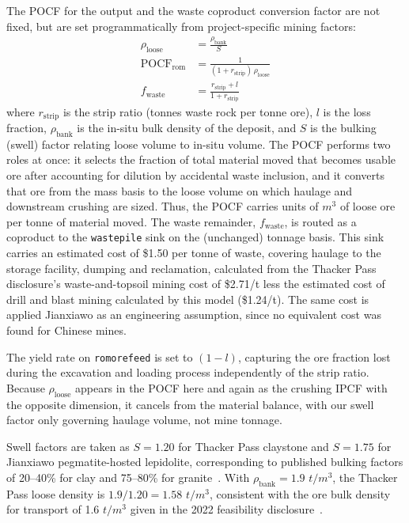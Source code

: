 \documentclass{article}
\renewcommand\_{\textunderscore\allowbreak}
\begin{document}
The POCF for the output and the waste coproduct conversion factor are not fixed, but are set programmatically from project-specific mining factors:
\begin{align}
	\rho_{\text{loose}} &= \frac{\rho_{\text{bank}}}{S} \\
	\text{POCF}_{\text{rom}} &= \frac{1}{(1 + r_{\text{strip}})\,\rho_{\text{loose}}} \\
	f_{\text{waste}} &= \frac{r_{\text{strip}} + l}{1 + r_{\text{strip}}}
\end{align}
where $r_{\text{strip}}$ is the strip ratio (tonnes waste rock per tonne ore), $l$ is the loss fraction, $\rho_{\text{bank}}$ is the in-situ bulk density of the deposit, and $S$ is the bulking (swell) factor relating loose volume to in-situ volume. The POCF performs two roles at once: it selects the fraction of total material moved that becomes usable ore after accounting for dilution by accidental waste inclusion, and it converts that ore from the mass basis to the loose volume on which haulage and downstream crushing are sized. Thus, the POCF carries units of $\si{m^3}$ of loose ore per tonne of material moved. The waste remainder, $f_{\text{waste}}$, is routed as a coproduct to the \texttt{waste\_pile} sink on the (unchanged) tonnage basis. This sink carries an estimated cost of \$1.50 per tonne of waste, covering haulage
to the storage facility, dumping and reclamation, calculated from the Thacker Pass disclosure's waste-and-topsoil mining cost of \$2.71/t 
\cite{sgscanadaincSK1300Technical2024} less the estimated cost of drill and blast mining calculated by this model (\$1.24/t). The same cost is applied Jianxiawo as an engineering assumption, since no equivalent cost was found for Chinese mines. 

The yield rate on \texttt{rom\_ore\_feed} is set to $(1-l)$, capturing the ore fraction lost during the excavation and loading process independently of the strip ratio. Because $\rho_{\text{loose}}$ appears in the POCF here and again as the crushing IPCF with the opposite dimension, it cancels from the material balance, with our swell factor only governing haulage volume, not mine tonnage.

Swell factors are taken as $S = 1.20$ for Thacker Pass claystone and $S = 1.75$ for Jianxiawo pegmatite-hosted lepidolite, corresponding to published bulking factors of 20--40\% for clay and 75--80\% for granite~\cite{theengineeringtoolboxSoilRockBulk2009}. With $\rho_{\text{bank}} = 1.9$ $\si{t/m^3}$, the Thacker Pass loose density is $1.9/1.20 = 1.58$ $\si{t/m^3}$, consistent with the ore bulk density for transport of 1.6 $\si{t/m^3}$ given in the 2022 feasibility disclosure~\cite{rothFeasibilityStudyNational2022}.
\end{document}

